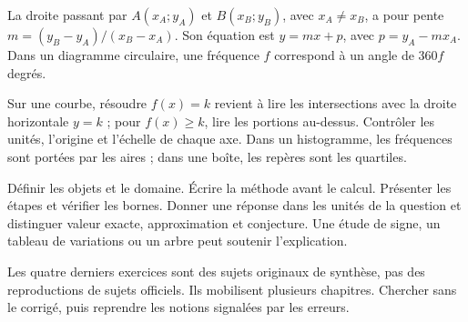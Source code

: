 \clearpage
{}
\begin{propriete}
La droite passant par $A(x_A;y_A)$ et $B(x_B;y_B)$, avec $x_A\neq x_B$,
a pour pente $m=(y_B-y_A)/(x_B-x_A)$. Son équation est $y=mx+p$,
avec $p=y_A-mx_A$. Dans un diagramme circulaire, une fréquence $f$ correspond
à un angle de $360f$ degrés.
\end{propriete}
\begin{savoirfaire}
Sur une courbe, résoudre $f(x)=k$ revient à lire les intersections avec la
droite horizontale $y=k$ ; pour $f(x)\geq k$, lire les portions au-dessus.
Contrôler les unités, l'origine et l'échelle de chaque axe. Dans un histogramme,
les fréquences sont portées par les aires ; dans une boîte, les repères sont les quartiles.
\end{savoirfaire}
\begin{savoirfaire}
Définir les objets et le domaine. Écrire la méthode avant le calcul.
Présenter les étapes et vérifier les bornes. Donner une réponse dans les unités
de la question et distinguer valeur exacte, approximation et conjecture.
Une étude de signe, un tableau de variations ou un arbre peut soutenir l'explication.
\end{savoirfaire}
\begin{attention}
Les quatre derniers exercices sont des sujets originaux de synthèse, pas
des reproductions de sujets officiels. Ils mobilisent plusieurs chapitres.
Chercher sans le corrigé, puis reprendre les notions signalées par les erreurs.
\end{attention}

\exercices

